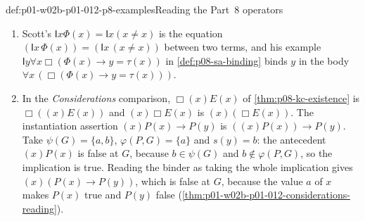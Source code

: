 \begin{hbexample}{def:p01-w02b-p01-012-p8-examples}{Reading the Part~8 operators}
\begin{enumerate}
  \((\nu p.\langle a\rangle p)\land q\); the source's
  \(\nu p.(\chi\land[a]p)\) keeps its parentheses because the body is
  compound.
\item Scott's \(\mathsf I x\Phi(x)=\mathsf I x(x\ne x)\) is the equation
  \((\mathsf I x\,\Phi(x))=(\mathsf I x\,(x\ne x))\) between two
  terms, and his example \(\mathsf I y\forall x\Box(\Phi(x)\to y=\tau(x))\)
  in \cref{def:p08-sa-binding} binds \(y\) in the body
  \(\forall x\,(\Box(\Phi(x)\to y=\tau(x)))\).
\item In the \emph{Considerations} comparison, \(\Box(x)E(x)\) of
  \cref{thm:p08-kc-existence} is \(\Box((x)E(x))\) and \((x)\Box E(x)\) is
  \((x)(\Box E(x))\).  The instantiation assertion
  \((x)P(x)\to P(y)\) is \(((x)P(x))\to P(y)\).  Take
  \(\psi(G)=\{a,b\}\), \(\varphi(P,G)=\{a\}\) and \(s(y)=b\): the
  antecedent \((x)P(x)\) is false at \(G\), because \(b\in\psi(G)\) and
  \(b\notin\varphi(P,G)\), so the implication is true.  Reading the binder
  as taking the whole implication gives \((x)(P(x)\to P(y))\), which is
  false at \(G\), because the value \(a\) of \(x\) makes \(P(x)\) true and
  \(P(y)\) false (\cref{thm:p01-w02b-p01-012-considerations-reading}).
\end{enumerate}
\end{hbexample}

